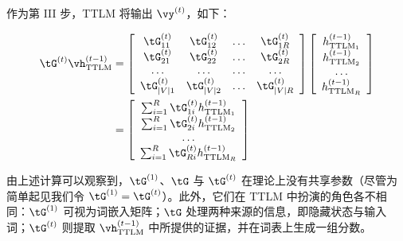 作为第 III 步，TTLM 将输出 $\vy^{(t)}$，如下：

\begin{align}
\tG^{(t)}\vh^{(t-1)}_{\textrm{TTLM}} &=
\left[\begin{array}{cccc}
\tG_{11}^{(t)} & \tG_{12}^{(t)} & \ldots & \tG_{1 R}^{(t)} \\
\tG_{21}^{(t)} & \tG_{22}^{(t)} & \ldots & \tG_{2 R}^{(t)} \\
\ldots & \ldots & \ldots & \ldots \\
\tG_{|V| 1}^{(t)} & \tG_{|V| 2}^{(t)} & \ldots & \tG_{|V| R}^{(t)}
\end{array}\right] \left[\begin{array}{c}
h^{(t-1)}_{{\textrm{TTLM}}_1} \\
h^{(t-1)}_{{\textrm{TTLM}}_2} \\
\ldots \\
h^{(t-1)}_{{\textrm{TTLM}}_R}
\end{array}\right] \nonumber \\
&= \left[\begin{array}{c}
\sum_{i=1}^{R}\tG_{1i}^{(t)} h^{(t-1)}_{{\textrm{TTLM}}_1}  \\
\sum_{i=1}^{R}\tG_{2i}^{(t)} h^{(t-1)}_{{\textrm{TTLM}}_2} \\
\ldots \\
\sum_{i=1}^{R}\tG_{Ri}^{(t)} h^{(t-1)}_{{\textrm{TTLM}}_R}
\end{array}\right] \nonumber
\end{align}

由上述计算可以观察到，$\tG^{(1)}$、$\tG$ 与 $\tG^{(t)}$ 在理论上没有共享参数（尽管为简单起见我们令 $\tG^{(1)} = \tG^{(t)}$）。此外，它们在 TTLM 中扮演的角色各不相同：$\tG^{(1)}$ 可视为词嵌入矩阵；$\tG$ 处理两种来源的信息，即隐藏状态与输入词；$\tG^{(t)}$ 则提取 $\vh^{(t-1)}_{\textrm{TTLM}}$ 中所提供的证据，并在词表上生成一组分数。
